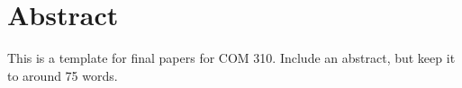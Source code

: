 \documentclass[
	title={TITLE FOR YOUR COM 310 FINAL PAPER},
	keywords={language models}
]{com310final}
\begin{document}
\maketitle

\section*{Abstract}
This is a template for final papers for COM 310.
Include an abstract, but keep it to around 75 words.\\

\keywords

\begin{introduction}

\end{introduction}

\begin{hypothesis}

\end{hypothesis}

\begin{study}

\end{study}

\begin{results}

\end{results}

\begin{discussion}

\end{discussion}
\end{document}
